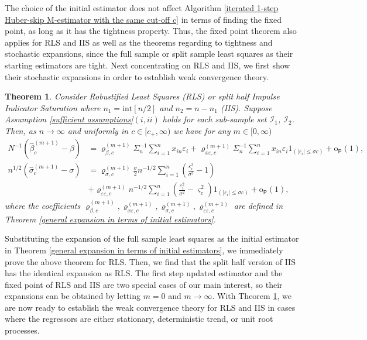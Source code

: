 \documentclass[11pt, letterpaper]{article}
\newtheorem{theorem}{Theorem}
\numberwithin{algorithm}{section}
\numberwithin{assumption}{section}
\numberwithin{lemma}{section}
\numberwithin{theorem}{section}
\numberwithin{corollary}{section}
\numberwithin{remark}{section}
\numberwithin{equation}{section}
\numberwithin{figure}{section}
\numberwithin{table}{section}
\begin{document}
The choice of the initial estimator does not affect Algorithm \ref{iterated 1-step Huber-skip M-estimator with the same cut-off c} in terms of finding the fixed point, as long as it has the tightness property. Thus, the fixed point theorem also applies for RLS and IIS as well as the theorems regarding to tightness and stochastic expansions, since the full sample or split sample least squares as their starting estimators are tight. Next concentrating on RLS and IIS, we first show their stochastic expansions in order to establish weak convergence theory.

\begin{theorem} \label{general expansion for RLS and IIS}
Consider Robustified Least Squares (RLS) or split half Impulse Indicator Saturation where $n_{1} = \mathrm{int}[n / 2]$ and $n_{2} = n - n_{1}$ (IIS). Suppose Assumption \ref{sufficient assumptions}$(i, ii)$ holds for each sub-sample set $\mathcal{I}_{1}$, $\mathcal{I}_{2}$.
Then, as $n \to \infty$ and uniformly in $c \in [c_{+}, \infty)$ we have for any $m \in [0, \infty)$
\begin{align*}
N^{-1} (\widehat{\beta}_{c}^{(m + 1)} - \beta) & = \varrho_{\beta, c}^{(m + 1)} \Sigma_{n}^{-1} \sum_{i = 1}^{n} x_{in} \varepsilon_{i} + \varrho_{x \varepsilon, c}^{(m + 1)} \Sigma_{n}^{-1} \sum_{i = 1}^{n} x_{in} \varepsilon_{i} 1_{(|\varepsilon_{i}| \le \sigma c)} +  \mathrm{o}_{\mathsf{P}}(1), \\
n^{1/2} (\widehat{\sigma}_{c}^{(m + 1)} - \sigma) & = \varrho_{\sigma, c}^{(m + 1)} \frac{\sigma}{2} n^{-1/2} \sum_{i = 1}^{n} (\frac{\varepsilon_{i}^{2}}{\sigma^{2}} - 1) \\
& + \varrho_{\varepsilon \varepsilon, c}^{(m + 1)} n^{-1/2} \sum_{i=1}^{n} (\frac{\varepsilon_{i}^{2}}{\sigma^{2}} - \varsigma_{c}^{2}) 1_{(|\varepsilon_{i}| \le \sigma c)} +  \mathrm{o}_{\mathsf{P}}(1),
\end{align*}
where the coefficients $\varrho_{\beta, c}^{(m + 1)}, \varrho_{x \varepsilon, c}^{(m + 1)}, \varrho_{\sigma, c}^{(m + 1)}, \varrho_{\varepsilon \varepsilon, c}^{(m + 1)}$ are defined in Theorem \ref{general expansion in terms of initial estimators}.
\end{theorem}

Substituting the expansion of the full sample least squares as the initial estimator in Theorem \ref{general expansion in terms of initial estimators}, we immediately prove the above theorem for RLS. Then, we find that the split half version of IIS has the identical expansion as RLS. The first step updated estimator and the fixed point of RLS and IIS are two special cases of our main interest, so their expansions can be obtained by letting $m = 0$ and $m \to \infty$. With Theorem \ref{general expansion for RLS and IIS}, we are now ready to establish the weak convergence theory for RLS and IIS in cases where the regressors are either stationary, deterministic trend, or unit root processes.
\end{document}
